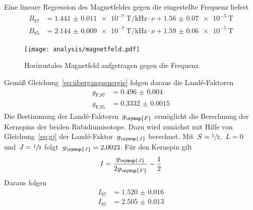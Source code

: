 %
Eine lineare Regression des Magnetfeldes gegen die eingestellte Frequenz liefert
%
\begin{align}
  B_{87}&=\SI{1.441(11)e-7}{\tesla\per\kilo\hertz}\cdot\nu
  +\SI{1.56(7)e-5}{\tesla} \\
  B_{85}&=\SI{2.144(9)e-7}{\tesla\per\kilo\hertz}\cdot\nu
  +\SI{1.59(6)e-5}{\tesla}
\end{align}
%
\begin{figure}[htb]
  \centering
  \texttt{[image: analysis/magnetfeld.pdf]}
  \caption{Horizontales Magnetfeld aufgetragen gegen die Frequenz.}
  \label{fig:magnetfeld}
\end{figure}
%
Gemäß Gleichung~\eqref{eq:übergangsenergie} folgen daraus die Landé-Faktoren
%
\begin{align}
  g_{\text{F,87}}&=\num{0.496(4)} \\
  g_{\text{F,85}}&=\num{0.3332(15)}
\end{align}
%
Die Bestimmung der Landé-Faktoren~$g_{\symup{F}}$ ermöglicht die Berechnung der
Kernspins der beiden Rubidiumisotope. Dazu wird zunächst mit Hilfe von
Gleichung~\eqref{eq:gj} der Landé-Faktor~$g_{\symup{J}}$ berechnet.
Mit~$S=\sfrac{1}{2}$,~$L=0$ und~$J=\sfrac{1}{2}$
folgt~$g_{\symup{J}}=\num{2.0023}$. Für den Kernspin gilt
%
\begin{equation*}
  I=\frac{g_{\symup{J}}}{2g_{\symup{F}}}-\frac{1}{2}
\end{equation*}
%
Daraus folgen
%
\begin{align}
  I_{87}&=\num{1.520(16)} \\
  I_{85}&=\num{2.505(13)}
\end{align}

